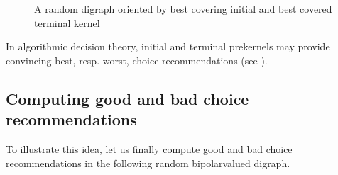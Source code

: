 \documentclass[a4paper,12pt,english]{sphinxhowto}
\let\sphinxpxdimen\pdfpxdimen\else\newdimen\sphinxpxdimen
\begin{document}
\begin{sphinxVerbatim}[commandchars=\\\{\},numbers=left,firstnumber=1,stepnumber=1]
\PYGZbs{}
                  \PYG{p}{[} \PYG{p}{]}\PYGZbs{}
                  \PYG{p}{[} \PYG{p}{]}
\end{sphinxVerbatim}

\begin{figure}[H]
\centering
\capstart

\noindent\sphinxincludegraphics[width=300\sphinxpxdimen]{{orientedLaterality}.png}
\caption{A random digraph oriented by best covering initial and
best covered terminal kernel}\label{\detokenize{tutorial:orientedlaterality}}\end{figure}

In algorithmic decision theory, initial and terminal prekernels may provide convincing best, resp. worst, choice recommendations (see {\hyperref[\detokenize{tutorial:rubis-tutorial-label}]{}}).


\subsection{Computing good and bad choice recommendations}
\label{\detokenize{tutorial:computing-good-and-bad-choice-recommendations}}
To illustrate this idea, let us finally compute good and bad choice recommendations in the following random bipolar\sphinxhyphen{}valued  digraph.
\end{document}
